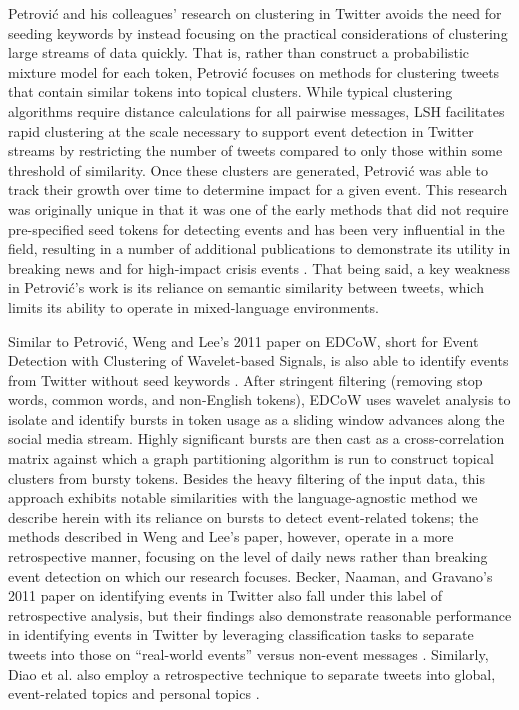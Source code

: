 \documentclass{sig-alternate}
\begin{document}
Petrovi\'{c} and his colleagues' research on clustering in Twitter avoids the need for seeding keywords by instead focusing on the practical considerations of clustering large streams of data quickly.
That is, rather than construct a probabilistic mixture model for each token, Petrovi\'{c} focuses on methods for clustering tweets that contain similar tokens into topical clusters.
While typical clustering algorithms require distance calculations for all pairwise messages, LSH facilitates rapid clustering at the scale necessary to support event detection in Twitter streams by restricting the number of tweets compared to only those within some threshold of similarity.
Once these clusters are generated, Petrovi\'{c} was able to track their growth over time to determine impact for a given event.
This research was originally unique in that it was one of the early methods that did not require pre-specified seed tokens for detecting events and has been very influential in the field, resulting in a number of additional publications to demonstrate its utility in breaking news and for high-impact crisis events \cite{osborne2014real,petrovic2013can,6601695}.
That being said, a key weakness in Petrovi\'{c}'s work is its reliance on semantic similarity between tweets, which limits its ability to operate in mixed-language environments.

Similar to Petrovi\'{c}, Weng and Lee's 2011 paper on EDCoW, short for Event Detection with Clustering of Wavelet-based Signals, is also able to identify events from Twitter without seed keywords \cite{weng2011event}.
After stringent filtering (removing stop words, common words, and non-English tokens), EDCoW uses wavelet analysis to isolate and identify bursts in token usage as a sliding window advances along the social media stream.
Highly significant bursts are then cast as a cross-correlation matrix against which a graph partitioning algorithm is run to construct topical clusters from bursty tokens.
Besides the heavy filtering of the input data, this approach exhibits notable similarities with the language-agnostic method we describe herein with its reliance on bursts to detect event-related tokens; the methods described in Weng and Lee's paper, however, operate in a more retrospective manner, focusing on the level of daily news rather than breaking event detection on which our research focuses.
Becker, Naaman, and Gravano's 2011 paper on identifying events in Twitter also fall under this label of retrospective analysis, but their findings also demonstrate reasonable performance in identifying events in Twitter by leveraging classification tasks to separate tweets into those on ``real-world events'' versus non-event messages \cite{becker2011beyond-tr,becker2011beyond}.
Similarly, Diao et al. also employ a retrospective technique to separate tweets into global, event-related topics and personal topics \cite{diao2012finding}.
\end{document}
